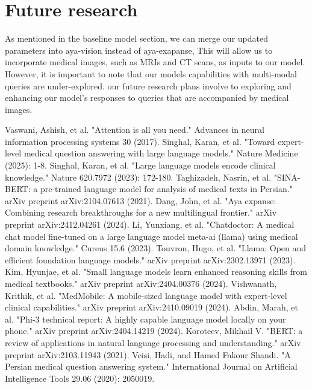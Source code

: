 \documentclass[conference]{IEEEtran}
\begin{document}
	\section*{Future research}
	As mentioned in the baseline model section, we can merge our updated parameters into aya-vision instead of aya-exapanse, This will allow us to incorporate medical images, such as MRIs and CT scans, as inputs to our model.
	However, it is important to note that our models capabilities with multi-modal queries are under-explored.
	our future research plans involve to exploring and enhancing our model’s responses to queries that are accompanied by medical images.
	
	\begin{thebibliography}{00}
		Vaswani, Ashish, et al. "Attention is all you need." Advances in neural information processing systems 30 (2017).
		Singhal, Karan, et al. "Toward expert-level medical question answering with large language models." Nature Medicine (2025): 1-8.
		Singhal, Karan, et al. "Large language models encode clinical knowledge." Nature 620.7972 (2023): 172-180.
		Taghizadeh, Nasrin, et al. "SINA-BERT: a pre-trained language model for analysis of medical texts in Persian." arXiv preprint arXiv:2104.07613 (2021).
		Dang, John, et al. "Aya expanse: Combining research breakthroughs for a new multilingual frontier." arXiv preprint arXiv:2412.04261 (2024).
		Li, Yunxiang, et al. "Chatdoctor: A medical chat model fine-tuned on a large language model meta-ai (llama) using medical domain knowledge." Cureus 15.6 (2023).
		Touvron, Hugo, et al. "Llama: Open and efficient foundation language models." arXiv preprint arXiv:2302.13971 (2023).
		Kim, Hyunjae, et al. "Small language models learn enhanced reasoning skills from medical textbooks." arXiv preprint arXiv:2404.00376 (2024).
		Vishwanath, Krithik, et al. "MedMobile: A mobile-sized language model with expert-level clinical capabilities." arXiv preprint arXiv:2410.09019 (2024).
		Abdin, Marah, et al. "Phi-3 technical report: A highly capable language model locally on your phone." 
		arXiv preprint arXiv:2404.14219 (2024).
		Koroteev, Mikhail V. "BERT: a review of applications in natural language processing and understanding." arXiv preprint arXiv:2103.11943 (2021).
		Veisi, Hadi, and Hamed Fakour Shandi. "A Persian medical question answering system." International Journal on Artificial Intelligence Tools 29.06 (2020): 2050019. 

\end{thebibliography}
\end{document}
